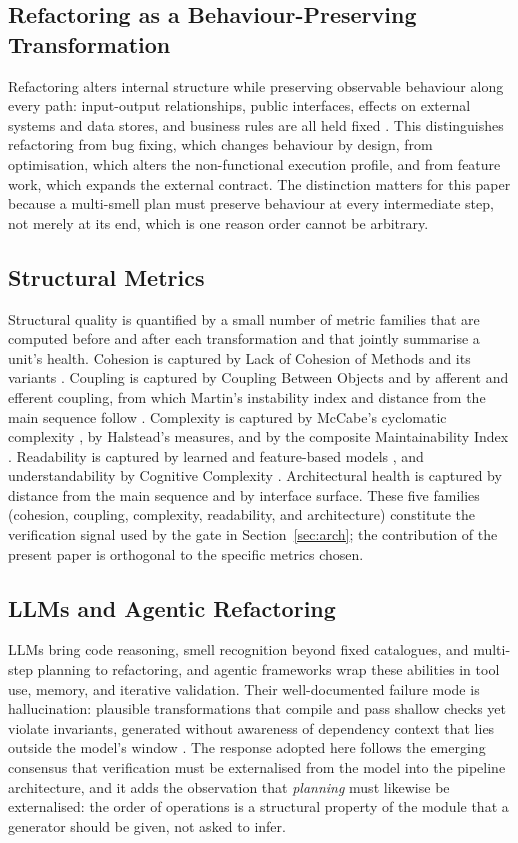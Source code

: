 \documentclass[journal,onecolumn,11pt]{IEEEtran}
\begin{document}
\subsection{Refactoring as a Behaviour-Preserving Transformation}
Refactoring alters internal structure while preserving observable behaviour along every path: input-output relationships, public interfaces, effects on external systems and data stores, and business rules are all held fixed \cite{fowler2018,opdyke1992}. This distinguishes refactoring from bug fixing, which changes behaviour by design, from optimisation, which alters the non-functional execution profile, and from feature work, which expands the external contract. The distinction matters for this paper because a multi-smell plan must preserve behaviour at every intermediate step, not merely at its end, which is one reason order cannot be arbitrary.

\subsection{Structural Metrics}
\label{sec:metrics}
Structural quality is quantified by a small number of metric families that are computed before and after each transformation and that jointly summarise a unit's health. Cohesion is captured by Lack of Cohesion of Methods and its variants \cite{chidamber1994}. Coupling is captured by Coupling Between Objects and by afferent and efferent coupling, from which Martin's instability index and distance from the main sequence follow \cite{chidamber1994,martin2003}. Complexity is captured by McCabe's cyclomatic complexity \cite{mccabe1976}, by Halstead's measures, and by the composite Maintainability Index \cite{coleman1994}. Readability is captured by learned and feature-based models \cite{buse2010,scalabrino2021}, and understandability by Cognitive Complexity \cite{campbell2018}. Architectural health is captured by distance from the main sequence and by interface surface. These five families (cohesion, coupling, complexity, readability, and architecture) constitute the verification signal used by the gate in Section~\ref{sec:arch}; the contribution of the present paper is orthogonal to the specific metrics chosen.

\subsection{LLMs and Agentic Refactoring}
LLMs bring code reasoning, smell recognition beyond fixed catalogues, and multi-step planning to refactoring, and agentic frameworks wrap these abilities in tool use, memory, and iterative validation. Their well-documented failure mode is hallucination: plausible transformations that compile and pass shallow checks yet violate invariants, generated without awareness of dependency context that lies outside the model's window \cite{gautam2025,xu2025mantra}. The response adopted here follows the emerging consensus that verification must be externalised from the model into the pipeline architecture, and it adds the observation that \emph{planning} must likewise be externalised: the order of operations is a structural property of the module that a generator should be given, not asked to infer.
\end{document}
